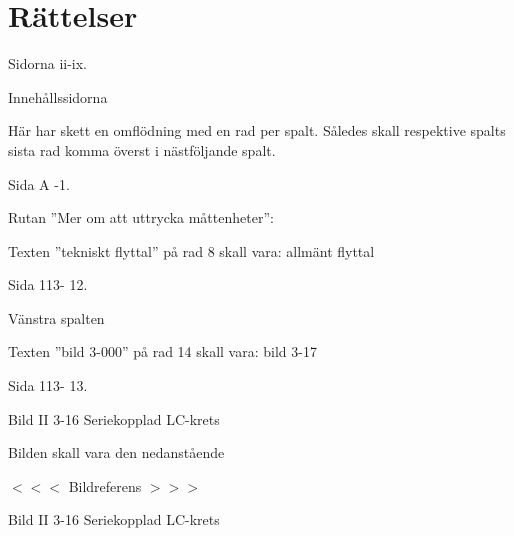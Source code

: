\section{Rättelser}

\onecolumn

Sidorna ii-ix.

Innehållssidorna

Här har skett en omflödning med en rad per spalt.  Således skall
respektive spalts sista rad komma överst i nästföljande spalt.

Sida A -1.

Rutan ''Mer om att uttrycka måttenheter'':

Texten ''tekniskt flyttal'' på rad 8 skall vara: allmänt flyttal

Sida 113- 12.

Vänstra spalten

Texten ''bild 3-000'' på rad 14 skall vara: bild 3-17

Sida 113- 13.

Bild II 3-16 Seriekopplad LC-krets

Bilden skall vara den nedanstående

$<<<$ Bildreferens $>>>$

Bild II 3-16 Seriekopplad LC-krets

\twocolumn